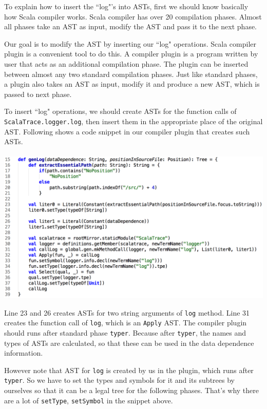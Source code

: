 \documentclass{article}[12pt]
\begin{document}
To explain how to insert the ``log"'s into ASTs, first we should know basically how Scala compiler works. Scala compiler has over 20 compilation phases. Almost all phases take an AST as input, modify the AST and pass it to the next phase. 

Our goal is to modify the AST by inserting our ``log" operations. Scala compiler plugin is a convenient tool to do this. A compiler plugin is a program written by user that acts as an additional compilation phase. The plugin can be inserted between almost any two standard compilation phases. Just like standard phases, a plugin also takes an AST as input, modify it and produce a new AST, which is passed to next phase. 

To insert ``log" operations, we should create ASTs for the function calls of \texttt{ScalaTrace.logger.log}, then insert them in the appropriate place of the original AST. Following shows a code snippet in our compiler plugin that creates such ASTs. 
\\
\\
\includegraphics[scale=0.5]{figures/figure7}

Line 23 and 26 creates ASTs for two string arguments of \texttt{log} method. Line 31 creates the function call of \texttt{log}, which is an \texttt{Apply} AST. The compiler plugin should runs after standard phase \texttt{typer}. Because after \texttt{typer}, the names and types of ASTs are calculated, so that these can be used in the data dependence information.

However note that AST for \texttt{log} is created by us in the plugin, which runs after \texttt{typer}. So we have to set the types and symbols for it and its subtrees by ourselves so that it can be a legal tree for the following phases. That's why there are a lot of \texttt{setType}, \texttt{setSymbol} in the snippet above. 
\end{document}

